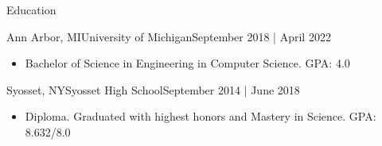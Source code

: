 \documentclass[]{mcdowellcv}
\begin{document}
    \makeheader
          

    \begin{cvsection}{Education}
        \begin{cvsubsection}{Ann Arbor, MI}{University of Michigan}{September 2018 | April 2022}
            \begin{itemize}
                \item 
                    Bachelor of Science in Engineering in Computer Science. 
                    \hfill {GPA: 4.0}
                    \vspace*{-4pt}
            \end{itemize}
        \end{cvsubsection}
        \begin{cvsubsection}{Syosset, NY}{Syosset High School}{September 2014 | June 2018}
            \begin{itemize}
                \item 
                    Diploma. Graduated with highest honors and Mastery in Science.
                    \hfill {GPA: 8.632/8.0}
                    \vspace*{-4pt}
            \end{itemize}
        \end{cvsubsection}
    \end{cvsection}
\end{document}

